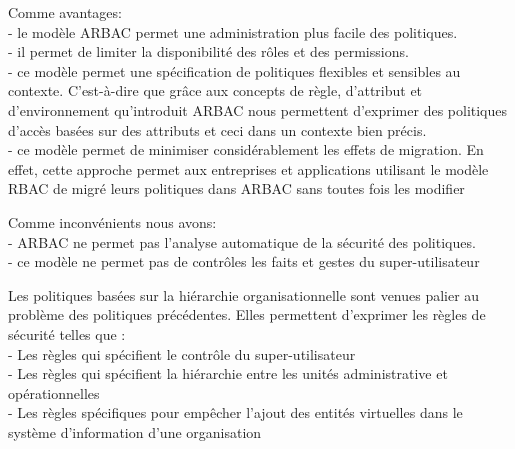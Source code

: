 
\label{sectionAvantageARBAC}

Comme avantages: \\
- le modèle ARBAC permet une administration plus facile des politiques.\\
- il permet de limiter la disponibilité des rôles et des permissions.\\
- ce modèle permet une spécification de politiques flexibles et sensibles au contexte. C'est-à-dire que grâce aux concepts de règle, d'attribut et d'environnement qu'introduit ARBAC nous permettent d'exprimer des politiques d'accès basées sur des attributs et ceci dans un contexte bien précis.\\
- ce modèle permet de minimiser considérablement les effets de migration. En effet, cette approche permet aux entreprises et applications utilisant le modèle RBAC de migré leurs politiques dans ARBAC sans toutes fois les modifier

\label{sectionInconvenientARBAC}

Comme inconvénients nous avons: \\
- ARBAC ne permet pas l'analyse automatique de la sécurité des politiques.\\
- ce modèle ne permet pas de contrôles les faits et gestes du super-utilisateur
 
 
\label{sectionHOrRBAC}

Les politiques basées sur la hiérarchie organisationnelle sont venues palier au problème des politiques précédentes. Elles permettent d'exprimer les règles de sécurité telles que \cite{theseBenoit} : \\  
- Les règles qui spécifient le contrôle du super-utilisateur \\
- Les règles qui spécifient la hiérarchie entre les unités administrative et opérationnelles \\
- Les règles spécifiques pour empêcher l'ajout des entités virtuelles dans le système d'information d'une organisation 
